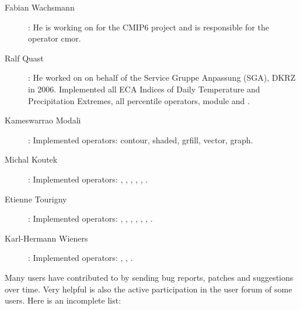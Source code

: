 \begin{description}
\item[Fabian Wachsmann]: He is working on {\CDO} for the CMIP6 project and is responsible for the operator cmor.

\item[Ralf Quast]: He worked on {\CDO} on behalf of the Service Gruppe Anpassung (SGA), DKRZ in 2006.
Implemented all ECA Indices of Daily Temperature and Precipitation Extremes, 
all percentile operators, module {} and {}.

\item[Kameswarrao Modali]: Implemented operators: contour, shaded, grfill, vector, graph.

\item[Michal Koutek]: Implemented operators: {}
{}, {}, {},
{}, {}, {}.

\item[Etienne Tourigny]: Implemented operators:  {}, {},
 {}, {}, {}, {}, {}.

\item[Karl-Hermann Wieners]: Implemented operators: {},  {},  {}.
\end{description}







\vspace{5mm}

Many users have contributed to {\CDO} by sending bug reports, patches
and suggestions over time.
Very helpful is also the active participation in the user forum of some users.
Here is an incomplete list:


